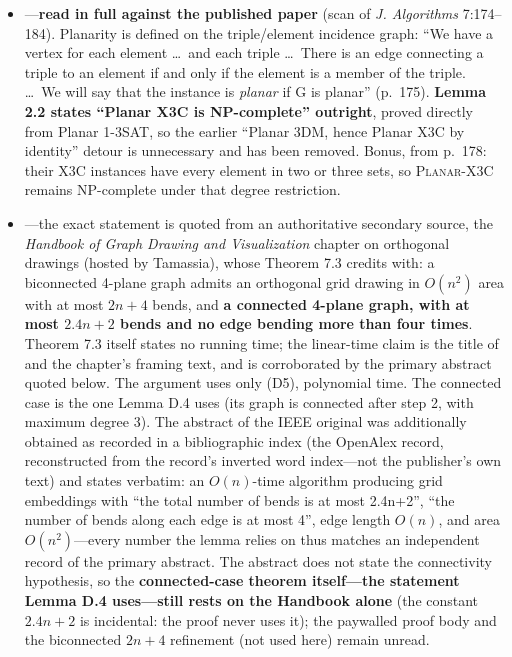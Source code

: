 \documentclass[11pt,a4paper]{article}
\theoremstyle{plain}
\theoremstyle{definition}
\theoremstyle{plain}
\theoremstyle{definition}
\theoremstyle{remark}
\newcommand{\PX}{\textsc{Planar-X3C}}
\begin{document}
\begin{itemize}
\item \textbf{\cite{DF86}}---\textbf{read in full against the published paper} (scan of
  \emph{J. Algorithms} 7:174--184). Planarity is defined on the triple/element incidence graph:
  ``We have a vertex for each element \dots\ and each triple \dots\ There is an edge connecting a
  triple to an element if and only if the element is a member of the triple. \dots\ We will say
  that the instance is \emph{planar} if G is planar'' (p.~175). \textbf{Lemma 2.2 states ``Planar
  X3C is NP-complete'' outright}, proved directly from Planar 1-3SAT, so the earlier ``Planar
  3DM, hence Planar X3C by identity'' detour is unnecessary and has been removed. Bonus, from
  p.~178: their X3C instances have every element in two or three sets, so \PX{} remains
  NP-complete under that degree restriction.
\item \textbf{\cite{TT89}}---the exact statement is quoted from an authoritative secondary
  source, the \emph{Handbook of Graph Drawing and Visualization} chapter on orthogonal drawings
  \cite{DG13} (hosted by Tamassia), whose Theorem 7.3 credits \cite{TT89} with: a biconnected
  4-plane graph admits an orthogonal grid drawing in $O(n^2)$ area with at most $2n+4$ bends,
  and \textbf{a connected 4-plane graph, with at most $2.4n+2$ bends and no edge bending more
  than four times}. Theorem 7.3 itself states no running time; the linear-time claim is the
  title of \cite{TT89} and the chapter's framing text, and is corroborated by the primary
  abstract quoted below. The argument uses only (D5), polynomial time. The connected case is
  the one Lemma D.4 uses (its graph is connected after step 2, with maximum degree 3). The abstract of the IEEE original was additionally
  obtained as recorded in a bibliographic index (the OpenAlex record, reconstructed from the
  record's inverted word index---not the publisher's own text) and states verbatim: an
  $O(n)$-time algorithm producing grid embeddings with ``the total number of bends is at most
  2.4n+2'', ``the number of bends along each edge is at most 4'', edge length $O(n)$, and area
  $O(n^2)$---every number the lemma relies on thus matches an independent record of the
  primary abstract. The abstract does not state the connectivity hypothesis, so the
  \textbf{connected-case theorem itself---the statement Lemma D.4 uses---still rests on the
  Handbook alone} (the constant $2.4n+2$ is incidental: the proof never uses it); the paywalled
  proof body and the biconnected $2n+4$ refinement (not used here) remain unread.
\end{itemize}
\end{document}
